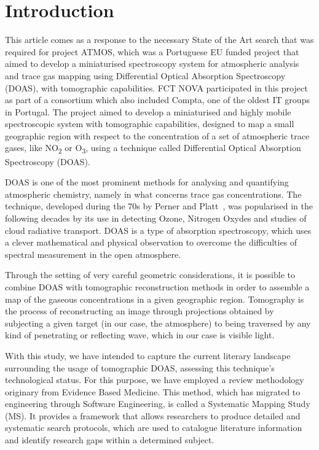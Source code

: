 \section{Introduction}
\label{sec:introduction}


This article comes as a response to the necessary State of the Art
search that was required for project ATMOS, which was a Portuguese EU
funded project that aimed to develop a miniaturised spectroscopy system
for atmospheric analysis and trace gas mapping using Differential
Optical Absorption Spectroscopy (DOAS), with tomographic capabilities.
FCT NOVA participated in this project as part of a consortium which also
included Compta, one of the oldest IT groups in Portugal. The project
aimed to develop a miniaturised and highly mobile spectroscopic system
with tomographic capabilities, designed to map a small geographic region
with respect to the concentration of a set of atmospheric trace gases,
like NO\textsubscript{2} or O\textsubscript{3}, using a technique called
Differential Optical Absorption Spectroscopy (DOAS).

DOAS is one of the most prominent methods for analysing and quantifying
atmospheric chemistry, namely in what concerns trace gas concentrations.
The technique, developed during the 70s by Perner and
Platt~\cite{Perner1976}, was popularised in the following decades by its
use in detecting Ozone, Nitrogen Oxydes and studies of cloud radiative
transport. DOAS is a type of absorption spectroscopy, which uses a
clever mathematical and physical observation to overcome the
difficulties of spectral measurement in the open atmosphere.

Through the setting of very careful geometric considerations, it is
possible to combine DOAS with tomographic reconstruction methods in
order to assemble a map of the gaseous concentrations in a given
geographic region. Tomography is the process of reconstructing an image
through projections obtained by subjecting a given target (in our case,
the atmosphere) to being traversed by any kind of penetrating or
reflecting wave, which in our case is visible light.

With this study, we have intended to capture the current literary
landscape surrounding the usage of tomographic DOAS, assessing this
technique's technological status. For this purpose, we have employed a
review methodology originary from Evidence Based Medicine. This method,
which has migrated to engineering through Software Engineering, is
called a Systematic Mapping Study (MS). It provides a framework that
allows researchers to produce detailed and systematic search protocols,
which are used to catalogue literature information and identify research
gaps within a determined subject.

